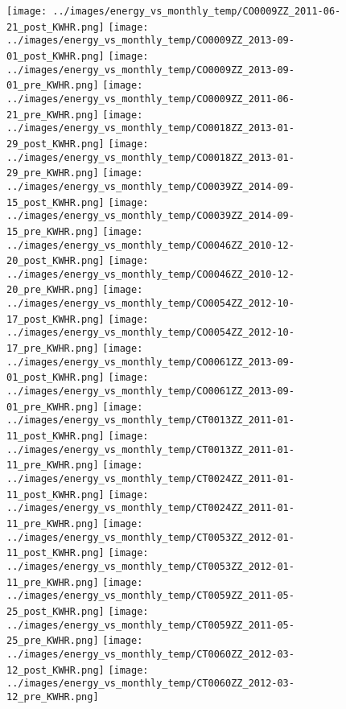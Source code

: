 \clearpage
\begin{figure}
\centering
\texttt{[image: ../images/energy\_vs\_monthly\_temp/CO0009ZZ\_2011-06-21\_post\_KWHR.png]}
\texttt{[image: ../images/energy\_vs\_monthly\_temp/CO0009ZZ\_2013-09-01\_post\_KWHR.png]}
\texttt{[image: ../images/energy\_vs\_monthly\_temp/CO0009ZZ\_2013-09-01\_pre\_KWHR.png]}
\texttt{[image: ../images/energy\_vs\_monthly\_temp/CO0009ZZ\_2011-06-21\_pre\_KWHR.png]}
\texttt{[image: ../images/energy\_vs\_monthly\_temp/CO0018ZZ\_2013-01-29\_post\_KWHR.png]}
\texttt{[image: ../images/energy\_vs\_monthly\_temp/CO0018ZZ\_2013-01-29\_pre\_KWHR.png]}
\texttt{[image: ../images/energy\_vs\_monthly\_temp/CO0039ZZ\_2014-09-15\_post\_KWHR.png]}
\texttt{[image: ../images/energy\_vs\_monthly\_temp/CO0039ZZ\_2014-09-15\_pre\_KWHR.png]}
\texttt{[image: ../images/energy\_vs\_monthly\_temp/CO0046ZZ\_2010-12-20\_post\_KWHR.png]}
\texttt{[image: ../images/energy\_vs\_monthly\_temp/CO0046ZZ\_2010-12-20\_pre\_KWHR.png]}
\texttt{[image: ../images/energy\_vs\_monthly\_temp/CO0054ZZ\_2012-10-17\_post\_KWHR.png]}
\texttt{[image: ../images/energy\_vs\_monthly\_temp/CO0054ZZ\_2012-10-17\_pre\_KWHR.png]}
\texttt{[image: ../images/energy\_vs\_monthly\_temp/CO0061ZZ\_2013-09-01\_post\_KWHR.png]}
\texttt{[image: ../images/energy\_vs\_monthly\_temp/CO0061ZZ\_2013-09-01\_pre\_KWHR.png]}
\texttt{[image: ../images/energy\_vs\_monthly\_temp/CT0013ZZ\_2011-01-11\_post\_KWHR.png]}
\texttt{[image: ../images/energy\_vs\_monthly\_temp/CT0013ZZ\_2011-01-11\_pre\_KWHR.png]}
\texttt{[image: ../images/energy\_vs\_monthly\_temp/CT0024ZZ\_2011-01-11\_post\_KWHR.png]}
\texttt{[image: ../images/energy\_vs\_monthly\_temp/CT0024ZZ\_2011-01-11\_pre\_KWHR.png]}
\texttt{[image: ../images/energy\_vs\_monthly\_temp/CT0053ZZ\_2012-01-11\_post\_KWHR.png]}
\texttt{[image: ../images/energy\_vs\_monthly\_temp/CT0053ZZ\_2012-01-11\_pre\_KWHR.png]}
\texttt{[image: ../images/energy\_vs\_monthly\_temp/CT0059ZZ\_2011-05-25\_post\_KWHR.png]}
\texttt{[image: ../images/energy\_vs\_monthly\_temp/CT0059ZZ\_2011-05-25\_pre\_KWHR.png]}
\texttt{[image: ../images/energy\_vs\_monthly\_temp/CT0060ZZ\_2012-03-12\_post\_KWHR.png]}
\texttt{[image: ../images/energy\_vs\_monthly\_temp/CT0060ZZ\_2012-03-12\_pre\_KWHR.png]}
\end{figure}
